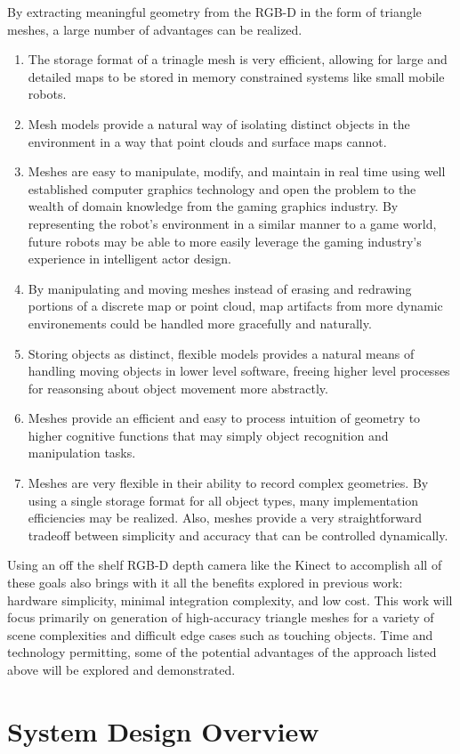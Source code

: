 \documentclass[english]{article}
\begin{document}
By extracting meaningful geometry from the RGB-D in the form of triangle meshes, a large number of advantages can be realized.
\begin{enumerate}
\item The storage format of a trinagle mesh is very efficient, allowing for large and detailed maps to be stored in memory constrained systems like small mobile robots. 
\item Mesh models provide a natural way of isolating distinct objects in the environment in a way that point clouds and surface maps cannot. 
\item Meshes are easy to manipulate, modify, and maintain in real time using well established computer graphics technology and open the problem to the wealth of domain knowledge from the gaming graphics industry. By representing the robot's environment in a similar manner to a game world, future robots may be able to more easily leverage the gaming industry's experience in intelligent actor design. 
\item By manipulating and moving meshes instead of erasing and redrawing portions of a discrete map or point cloud, map artifacts from more dynamic environements could be handled more gracefully and naturally.
\item Storing objects as distinct, flexible models provides a natural means of handling moving objects in lower level software, freeing higher level processes for reasonsing about object movement more abstractly.
\item Meshes provide an efficient and easy to process intuition of geometry to higher cognitive functions that may simply object recognition and manipulation tasks.
\item Meshes are very flexible in their ability to record complex geometries. By using a single storage format for all object types, many implementation efficiencies may be realized. Also, meshes provide a very straightforward tradeoff between simplicity and accuracy that can be controlled dynamically.
\end{enumerate}
Using an off the shelf RGB-D depth camera like the Kinect to accomplish all of these goals also brings with it all the benefits explored in previous work: hardware simplicity, minimal integration complexity, and low cost. This work will focus primarily on generation of high-accuracy triangle meshes for a variety of scene complexities and difficult edge cases such as touching objects. Time and technology permitting, some of the potential advantages of the approach listed above will be explored and demonstrated.

\section*{System Design Overview}





\end{document}
